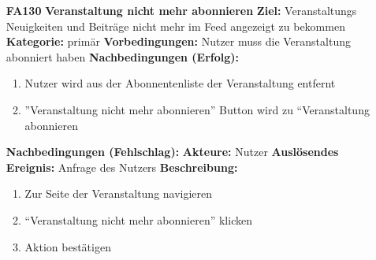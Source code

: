 \documentclass[parskip=full]{scrartcl}
\begin{document}
\begin{itemize}[nosep]
						
			\item[\textbf{FA130}]\textbf{Veranstaltung nicht mehr abonnieren}
			\newline \textbf{Ziel:} Veranstaltungs Neuigkeiten und Beiträge nicht mehr im Feed angezeigt zu bekommen
			\newline \textbf{Kategorie:} primär
			\newline \textbf{Vorbedingungen:} Nutzer muss die Veranstaltung abonniert haben
			\newline \textbf{Nachbedingungen (Erfolg):} 
			\begin{enumerate}[nosep]
				\item Nutzer wird aus der Abonnentenliste der Veranstaltung entfernt
				\item ”Veranstaltung nicht mehr abonnieren” Button wird zu “Veranstaltung abonnieren 
			\end{enumerate}
			\textbf{Nachbedingungen (Fehlschlag):}
			\newline \textbf{Akteure:} Nutzer
			\newline \textbf{Auslösendes Ereignis:} Anfrage des Nutzers
			\newline\newline \textbf{Beschreibung:}
			\begin{enumerate}[nosep]
				\item Zur Seite der Veranstaltung navigieren
				\item “Veranstaltung nicht mehr abonnieren” klicken
				\item  Aktion bestätigen\\
			\end{enumerate}
						

\end{itemize}
\end{document}
